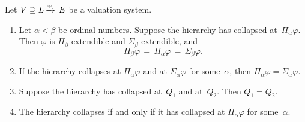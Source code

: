 \documentclass[main.tex]{subfiles}
\begin{document}
\begin{lem}
\label{L:collapse}
Let $V \supseteq L\,\smash{\xrightarrow{\varphi}\,E}$
be a valuation system.
\begin{enumerate}
\item
\label{L:collapse-1}
Let $\alpha<\beta$ be ordinal numbers.
Suppose the hierarchy has collapsed at~$\Pi_\alpha \varphi$.
Then $\varphi$ is $\Pi_\beta$-extendible and $\Sigma_\beta$-extendible,
and  
\begin{equation*}
\Pi_\beta \varphi \,=\, \Pi_\alpha \varphi \,=\, \Sigma_\beta \varphi.
\end{equation*}
\item
\label{L:collapse-2}
If the hierarchy collapses
at $\Pi_\alpha \varphi$ and at $\Sigma_\alpha\varphi$
for some~$\alpha$,
then $\Pi_\alpha\varphi = \Sigma_\alpha\varphi$.

\item
\label{L:collapse-3}
Suppose the hierarchy has collapsed at~$Q_1$ and at~$Q_2$.
Then $Q_1 = Q_2$.
\item
\label{L:collapse-4}
The hierarchy collapses
if and only if 
it has collapsed at $\Pi_\alpha \varphi$
for some~$\alpha$.
\end{enumerate}
\end{lem}
\end{document}
